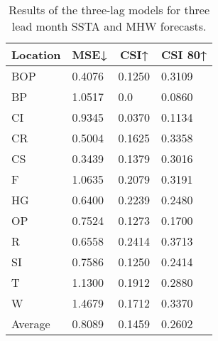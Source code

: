 \documentclass[11pt, a4paper]{article}
\begin{document}
\begin{table}[H]
\centering
\footnotesize
\caption{Results of the three-lag models for three lead month SSTA and MHW forecasts.}
\begin{tabular}{llll}
\multicolumn{1}{c}{\textbf{Location}} & \multicolumn{1}{c}{\textbf{MSE↓}} & \multicolumn{1}{c}{\textbf{CSI↑}} & \multicolumn{1}{c}{\textbf{CSI 80↑}} \\ \hline
BOP                         & 0.4076                            & 0.1250                            & 0.3109                               \\
BP                        & 1.0517                            & 0.0                               & 0.0860                               \\
CI                        & 0.9345                            & 0.0370                            & 0.1134                               \\
CR                           & 0.5004                            & 0.1625                            & 0.3358                               \\
CS                           & 0.3439                            & 0.1379                            & 0.3016                               \\
F                             & 1.0635                            & 0.2079                            & 0.3191                               \\
HG                          & 0.6400                            & 0.2239                            & 0.2480                               \\
OP                       & 0.7524                            & 0.1273                            & 0.1700                               \\
R                                & 0.6558                            & 0.2414                            & 0.3713                               \\
SI                        & 0.7586                            & 0.1250                            & 0.2414                               \\
T                              & 1.1300                            & 0.1912                            & 0.2880                               \\
W                             & 1.4679                            & 0.1712                            & 0.3370                               \\ \hline
Average                               & 0.8089                            & 0.1459                            & 0.2602
\end{tabular}
\end{table}
\end{document}
